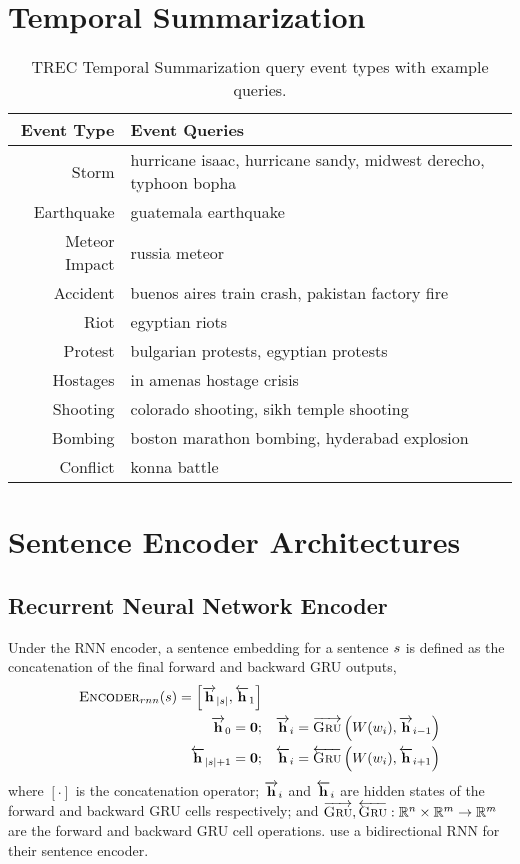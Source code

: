 \begin{appendices}
\section{Temporal Summarization}
\begin{table}[h]
\begin{tabular}{r | l}
\textbf{Event Type} & \textbf{Event Queries} \\
\hline
Storm & hurricane isaac, hurricane sandy, midwest derecho, typhoon bopha\\
Earthquake & guatemala earthquake  \\
Meteor Impact & russia meteor \\
Accident & buenos aires train crash,  pakistan factory fire\\
Riot & egyptian riots\\
Protest & bulgarian protests, egyptian protests \\
Hostages & in amenas hostage crisis \\
Shooting & colorado shooting, sikh temple shooting\\
Bombing & boston marathon bombing, hyderabad explosion \\
Conflict & konna battle \\
\end{tabular}
\caption{TREC Temporal Summarization query event types with example queries.} 
\label{fig:eventtypes}
\end{table}


\section{Sentence Encoder Architectures} 


\subsection{Recurrent Neural Network Encoder}

Under the RNN encoder, a sentence embedding for a sentence $s$ is defined 
as the concatenation of the final forward and backward GRU outputs,
\begin{align}
\textsc{Encoder}_{rnn}(s) = \Big[\overrightarrow{\mathbf{h}}_{|s|}, \overleftarrow{\mathbf{h}}_{1} \Big] & \\
  \overrightarrow{\mathbf{h}}_0 = \mathbf{0};& \quad 
  \overrightarrow{\mathbf{h}}_i = \overrightarrow{\textsc{Gru}}\left(W(w_i), \overrightarrow{\mathbf{h}}_{i-1}\right) \\
  \overleftarrow{\mathbf{h}}_{|s| + 1} = \mathbf{0};& \quad 
  \overleftarrow{\mathbf{h}}_i = \overleftarrow{\textsc{Gru}}\left(W(w_i), \overleftarrow{\mathbf{h}}_{i+1}\right) 
\end{align}
where $[\cdot]$ is the concatenation operator; $\overrightarrow{\mathbf{h}}_i$ and $\overleftarrow{\mathbf{h}}_i$ are
hidden states of the forward and backward GRU cells respectively; and 
$\overrightarrow{\textsc{Gru}}, \overleftarrow{\textsc{Gru}} : \mathbb{R}^n \times \mathbb{R}^m 
\rightarrow \mathbb{R}^m$ are the forward and backward GRU cell 
operations.
\cite{nallapati2016summarunner} use a bidirectional RNN for their sentence
encoder.



\end{appendices}
